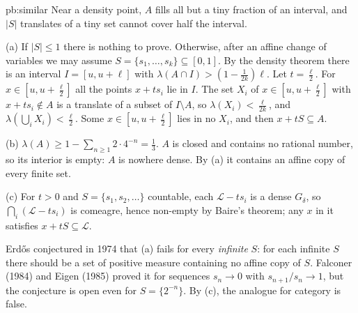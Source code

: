 \begin{solution}{pb:similar}
\idea Near a density point, $A$ fills all but a tiny fraction of an interval, and $|S|$ translates of a tiny set cannot cover half the interval.

\writeup (a) If $|S|\le1$ there is nothing to prove. Otherwise, after an affine change of variables we may assume $S=\{s_1,\dots,s_k\}\subseteq[0,1]$. By the density theorem
there is an interval $I=[u,u+\ell]$ with $\lambda(A\cap I)>(1-\frac1{2k})\ell$. Let $t=\frac\ell2$. For $x\in[u,u+\frac\ell2]$ all the points $x+ts_i$ lie in $I$. The set
$X_i$ of $x\in[u,u+\frac\ell2]$ with $x+ts_i\notin A$ is a translate of a subset of $I\setminus A$, so $\lambda(X_i)<\frac\ell{2k}$, and $\lambda(\bigcup_iX_i)<\frac\ell2$.
Some $x\in[u,u+\frac\ell2]$ lies in no $X_i$, and then $x+tS\subseteq A$.

(b) $\lambda(A)\ge1-\sum_{n\ge1}2\cdot4^{-n}=\frac13$. $A$ is closed and contains no rational number, so its interior is empty: $A$ is nowhere dense. By (a) it contains an
affine copy of every finite set.

(c) For $t>0$ and $S=\{s_1,s_2,\dots\}$ countable, each $\mathcal L-ts_i$ is a dense $G_\delta$, so $\bigcap_i(\mathcal L-ts_i)$ is comeagre, hence non-empty by Baire's theorem;
any $x$ in it satisfies $x+tS\subseteq\mathcal L$.

\leads Erdős conjectured in 1974 that (a) fails for every \emph{infinite} $S$: for each infinite $S$ there should be a set of positive measure containing no affine copy
of $S$. Falconer (1984) and Eigen (1985) proved it for sequences $s_n\to0$ with $s_{n+1}/s_n\to1$, but the conjecture is open even for $S=\{2^{-n}\}$. By (c), the
analogue for category is false.
\end{solution}

